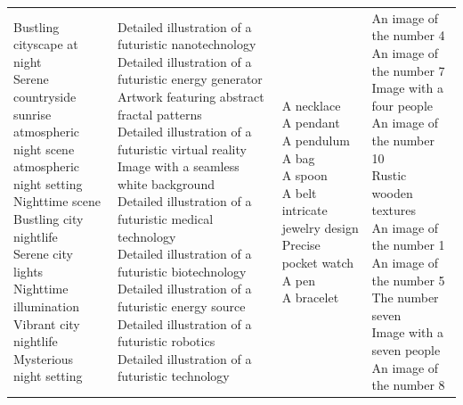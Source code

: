 \documentclass{article}
\begin{document}
\begin{table}[htbp]
\begin{tabular}{|p{4.0cm}|p{4.0cm}|p{4.0cm}|p{4.0cm}|}
\hline
\makecell[t]{Bustling cityscape at night \\ Serene countryside sunrise \\ atmospheric night scene \\ atmospheric night setting \\ Nighttime scene \\ Bustling city nightlife \\ Serene city lights \\ Nighttime illumination \\ Vibrant city nightlife \\ Mysterious night setting} & \makecell[t]{Detailed illustration of a futuristic nanotechnology \\ Detailed illustration of a futuristic energy generator \\ Artwork featuring abstract fractal patterns \\ Detailed illustration of a futuristic virtual reality \\ Image with a seamless white background \\ Detailed illustration of a futuristic medical technology \\ Detailed illustration of a futuristic biotechnology \\ Detailed illustration of a futuristic energy source \\ Detailed illustration of a futuristic robotics \\ Detailed illustration of a futuristic technology} & \makecell[t]{A necklace \\ A pendant \\ A pendulum \\ A bag \\ A spoon \\ A belt \\ intricate jewelry design \\ Precise pocket watch \\ A pen \\ A bracelet} & \makecell[t]{An image of the number 4 \\ An image of the number 7 \\ Image with a four people \\ An image of the number 10 \\ Rustic wooden textures \\ An image of the number 1 \\ An image of the number 5 \\ The number seven \\ Image with a seven people \\ An image of the number 8} \\

\end{tabular}
\end{table}
\end{document}
